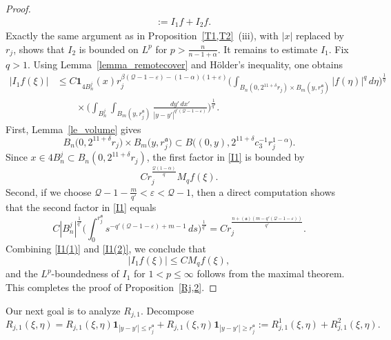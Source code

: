 \documentclass[12pt]{amsart}
\begin{document}
\begin{proof}
\begin{align*}
    &:= I_1f + I_2f.
\end{align*}
Exactly the same argument as in Proposition~\ref{T1,T2}~(iii), with $|x|$ replaced by $r_j$, shows that $I_2$ is bounded on $L^p$ for $p>\frac{n}{n-1+\alpha}$. It remains to estimate $I_1$. Fix $q>1$. Using Lemma~\ref{lemma_remotecover} and H\"older's inequality, one obtains
\begin{align}\label{I1}
    |I_1f(\xi)|
    &\le C  \mathbf{1}_{4B_n^j}(x) r_j^{\beta(\mathcal{Q}-1-\varepsilon) - (1-\alpha)(1+\varepsilon)} \biggl( \int_{B_n(0, 2^{11+\delta} r_j) \times B_m (y, r_j^{\mathfrak a} )} |f(\eta)|^q \, d\eta \biggr)^{\!\frac{1}{q}} \nonumber\\
    &\qquad\times \biggl( \int_{B_n^j} \int_{B_m(y,r_j^{\mathfrak a})} \frac{dy'\,dx'}{|y-y'|^{q'(\mathcal{Q}-1-\varepsilon)}} \biggr)^{\!\frac{1}{q'}}.
\end{align}
First, Lemma~\ref{le_volume} gives
\begin{equation*}
    B_n\bigl(0, 2^{11+\delta} r_j\bigr) \times B_m \bigl(y, r_j^{\mathfrak a} \bigr) \subset B\bigl( (0,y), 2^{11+\delta} c_3^{-1} r_j^{1-\alpha} \bigr).
\end{equation*}
Since $x\in 4B_n^j \subset B_n(0, 2^{11+\delta} r_j)$, the first factor in \eqref{I1} is bounded by
\begin{equation}\label{I1(1)}
    C r_j^{\frac{\mathcal{Q}(1-\alpha)}{q}} M_q f(\xi).
\end{equation}
Second, if we choose $\mathcal{Q}-1-\frac{m}{q'}<\varepsilon<\mathcal{Q}-1$, then a direct computation shows that the second factor in \eqref{I1} equals
\begin{equation}\label{I1(2)}
    C |B_n^j|^{\frac{1}{q'}} \biggl(\int_0^{r_j^{\mathfrak a}} s^{-q'(\mathcal{Q}-1-\varepsilon) +m-1} \, ds \biggr)^{\!\frac{1}{q'}} = C r_j^{\frac{n + (\mathfrak a)( m-q'(\mathcal{Q}-1-\varepsilon) )}{q'}}.
\end{equation}
Combining \eqref{I1(1)} and \eqref{I1(2)}, we conclude that
\begin{equation*}
    |I_1f(\xi)| \le C M_q f(\xi),
\end{equation*}
and the $L^p$-boundedness of $I_1$ for $1<p\le \infty$ follows from the maximal theorem. This completes the proof of Proposition~\ref{Rj,2}.
\end{proof}

Our next goal is to analyze $R_{j,1}$. Decompose
\begin{equation}\label{furthersplit}
    R_{j,1}(\xi,\eta) = R_{j,1}(\xi,\eta) \mathbf{1}_{|y-y'|\le r_{j}^{\mathfrak a}} + R_{j,1}(\xi,\eta) \mathbf{1}_{|y-y'|\ge r_{j}^{\mathfrak a}}:= R_{j,1}^1(\xi,\eta) + R_{j,1}^2(\xi,\eta).
\end{equation}
\end{document}
